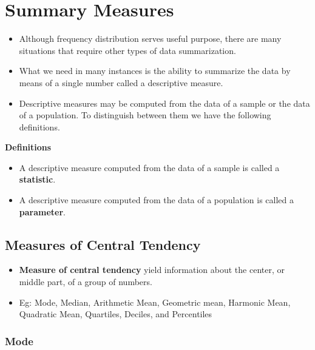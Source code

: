\documentclass[]{book}
\begin{document}
\newpage

\hypertarget{summary-measures}{%
\section{Summary Measures}\label{summary-measures}}

\begin{itemize}
\item
  Although frequency distribution serves useful purpose, there are many situations that require other types of data summarization.
\item
  What we need in many instances is the ability to summarize the data by means of a single number called a descriptive measure.
\item
  Descriptive measures may be computed from the data of a sample or the data of a population. To distinguish between them we have the following definitions.
\end{itemize}

\textbf{Definitions}

\begin{itemize}
\item
  A descriptive measure computed from the data of a sample is called a \textbf{statistic}.
\item
  A descriptive measure computed from the data of a population is called a \textbf{parameter}.
\end{itemize}

\hypertarget{measures-of-central-tendency}{%
\subsection{Measures of Central Tendency}\label{measures-of-central-tendency}}

\begin{itemize}
\item
  \textbf{Measure of central tendency} yield information about the center, or middle part, of a group of numbers.
\item
  Eg: Mode, Median, Arithmetic Mean, Geometric mean, Harmonic Mean, Quadratic Mean, Quartiles, Deciles, and Percentiles
\end{itemize}

\hypertarget{mode}{%
\subsubsection{Mode}\label{mode}}
\end{document}
